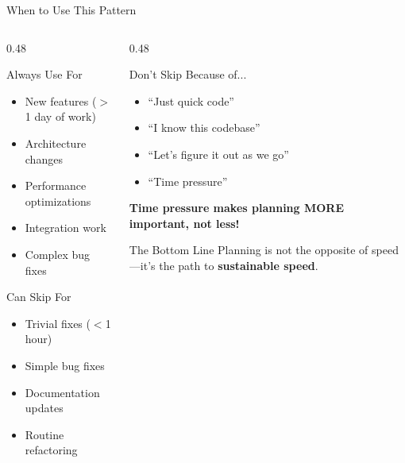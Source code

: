 \documentclass[aspectratio=169,10pt]{beamer}
\begin{document}
\begin{frame}{When to Use This Pattern}
    \begin{columns}[T]
        \begin{column}{0.48\textwidth}
            \begin{block}{Always Use For}
                \begin{itemize}
                    \item New features ($>$1 day of work)
                    \item Architecture changes
                    \item Performance optimizations
                    \item Integration work
                    \item Complex bug fixes
                \end{itemize}
            \end{block}
            \begin{block}{Can Skip For}
                \begin{itemize}
                    \item Trivial fixes ($<$1 hour)
                    \item Simple bug fixes
                    \item Documentation updates
                    \item Routine refactoring
                \end{itemize}
            \end{block}
        \end{column}
        \begin{column}{0.48\textwidth}
            \begin{alertblock}{Don't Skip Because of...}
                \begin{itemize}
                    \item ``Just quick code''
                    \item ``I know this codebase''
                    \item ``Let's figure it out as we go''
                    \item ``Time pressure''
                \end{itemize}
                \vspace{0.2cm}
                \textbf{Time pressure makes planning MORE important, not less!}
            \end{alertblock}
            \vspace{0.3cm}
            \begin{block}{The Bottom Line}
                Planning is not the opposite of speed---it's the path to \textbf{sustainable speed}.
            \end{block}
        \end{column}
    \end{columns}

\end{frame}
\end{document}
